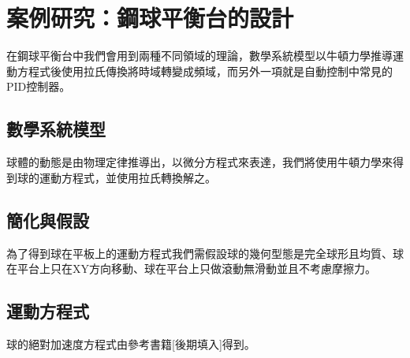\chapter{案例研究：鋼球平衡台的設計}
在鋼球平衡台中我們會用到兩種不同領域的理論，數學系統模型以牛頓力學推導運動方程式後使用拉氏傳換將時域轉變成頻域，而另外一項就是自動控制中常見的PID控制器。\\

\section{數學系統模型}
球體的動態是由物理定律推導出，以微分方程式來表達，我們將使用牛頓力學來得到球的運動方程式，並使用拉氏轉換解之。\\

\section{簡化與假設}
為了得到球在平板上的運動方程式我們需假設球的幾何型態是完全球形且均質、球在平台上只在XY方向移動、球在平台上只做滾動無滑動並且不考慮摩擦力。\\

\section{運動方程式}

球的絕對加速度方程式由參考書籍[後期填入]得到。\\

